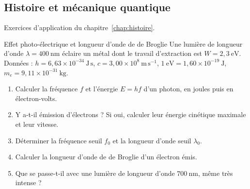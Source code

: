 \subsection{Histoire et mécanique quantique}\label{sec:ex-histoire}

Exercices d'application du chapitre~\ref{chap:histoire}.

\begin{exercice}{Effet photo-électrique et longueur d'onde de de Broglie}\label{ex:photoelec}
Une lumière de longueur d'onde $\lambda=400\ \mathrm{nm}$ éclaire un métal dont le travail
d'extraction est $W=2{,}3\ \mathrm{eV}$. Données : $h=6{,}63\times10^{-34}\ \mathrm{J\,s}$,
$c=3{,}00\times10^{8}\ \mathrm{m\,s^{-1}}$, $1\ \mathrm{eV}=1{,}60\times10^{-19}\ \mathrm{J}$,
$m_e=9{,}11\times10^{-31}\ \mathrm{kg}$.
\begin{enumerate}[label=\arabic*.,nosep]
  \item Calculer la fréquence $f$ et l'énergie $E=hf$ d'un photon, en joules puis en électron-volts.
  \item Y a-t-il émission d'électrons ? Si oui, calculer leur énergie cinétique maximale et leur
        vitesse.
  \item Déterminer la fréquence seuil $f_0$ et la longueur d'onde seuil $\lambda_0$.
  \item Calculer la longueur d'onde de de Broglie d'un électron émis.
  \item Que se passe-t-il avec une lumière de longueur d'onde $700\ \mathrm{nm}$, même très intense ?
\end{enumerate}
\end{exercice}
